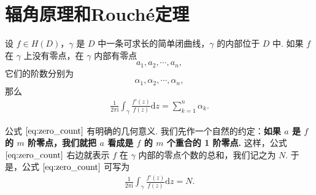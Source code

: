 \documentclass[../../main.tex]{subfiles}%
\begin{document}
\section{辐角原理和Rouché定理}

\begin{theorem}\label{theorem:定理4.4.1}
设 \( f \in H(D) \)，\( \gamma \) 是 \( D \) 中一条可求长的简单闭曲线，\( \gamma \) 的内部位于 \( D \) 中. 如果 \( f \) 在 \( \gamma \) 上没有零点，在 \( \gamma \) 内部有零点
\[
a_1, a_2, \cdots, a_n,
\]
它们的阶数分别为
\[
\alpha_1, \alpha_2, \cdots, \alpha_n,
\]
那么
\begin{align}
\frac{1}{2\pi \mathrm{i}} \int_{\gamma} \frac{f'(z)}{f(z)} \mathrm{d}z = \sum_{k=1}^{n} \alpha_k. \label{eq:zero_count}
\end{align}
\end{theorem}
\begin{remark}
公式 \(\eqref{eq:zero_count}\) 有明确的几何意义. 我们先作一个自然的约定：\textbf{如果 \( a \) 是 \( f \) 的 \( m \) 阶零点，我们就把 \( a \) 看成是 \( f \) 的 \( m \) 个重合的 1 阶零点.} 这样，公式 \(\eqref{eq:zero_count}\) 右边就表示 \( f \) 在 \( \gamma \) 内部的零点个数的总和，我们记之为 \( N \). 于是，公式 \(\eqref{eq:zero_count}\) 可写为
\begin{align}
\frac{1}{2\pi \mathrm{i}} \int_{\gamma} \frac{f'(z)}{f(z)} \mathrm{d}z = N. \label{eq:zero_count_geo}
\end{align}
\end{remark}
\end{document}
